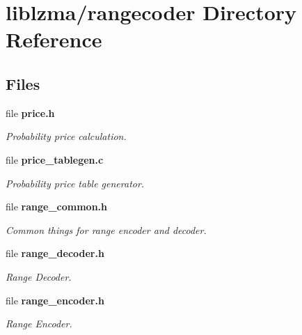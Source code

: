 \section{liblzma/rangecoder Directory Reference}
\label{dir_853e2fd5c4ef498883c367265d805e85}
\subsection*{Files}
\begin{DoxyCompactItemize}
\item 
file \textbf{ price.\+h}
\begin{DoxyCompactList}\small\item\em Probability price calculation. \end{DoxyCompactList}\item 
file \textbf{ price\+\_\+tablegen.\+c}
\begin{DoxyCompactList}\small\item\em Probability price table generator. \end{DoxyCompactList}\item 
file \textbf{ range\+\_\+common.\+h}
\begin{DoxyCompactList}\small\item\em Common things for range encoder and decoder. \end{DoxyCompactList}\item 
file \textbf{ range\+\_\+decoder.\+h}
\begin{DoxyCompactList}\small\item\em Range Decoder. \end{DoxyCompactList}\item 
file \textbf{ range\+\_\+encoder.\+h}
\begin{DoxyCompactList}\small\item\em Range Encoder. \end{DoxyCompactList}\end{DoxyCompactItemize}
